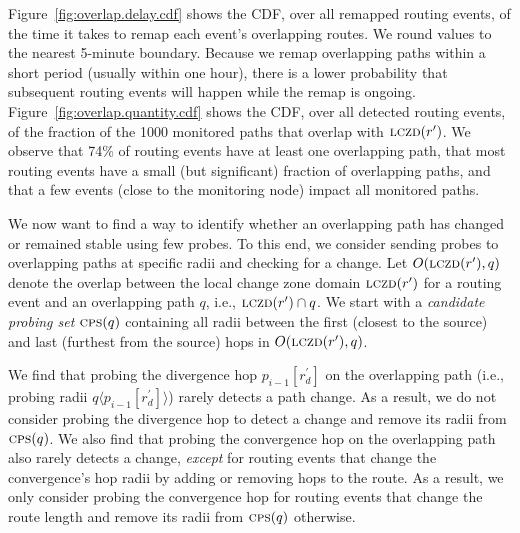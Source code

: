 
Figure~\ref{fig:overlap.delay.cdf} shows the CDF, over all remapped
routing events, of the time it takes to remap each event's
overlapping routes.  We round values to the nearest 5-minute
boundary.  Because we remap overlapping paths within a short period
(usually within one hour), there is a lower probability that
subsequent routing events will happen while the remap is ongoing.
Figure~\ref{fig:overlap.quantity.cdf} shows the CDF, over all
detected routing events, of the fraction of the 1000 monitored paths
that overlap with $\mathrm{\textsc{lczd}}(r')$.  We observe that 74\% of routing
events have at least one overlapping path, that most routing events
have a small (but significant) fraction of overlapping paths, and
that a few events (close to the monitoring node) impact all
monitored paths.

  We now want to find a way
to identify whether an overlapping path has changed or remained
stable using few probes.  To this end, we consider sending probes to
overlapping paths at specific radii and checking for a change.  Let
$O(\mathrm{\textsc{lczd}}(r'), q)$ denote the overlap between the local change zone
domain $\mathrm{\textsc{lczd}}(r')$ for a routing event and an overlapping path $q$,
i.e., $\mathrm{\textsc{lczd}}(r')\cap{}q$.  We start with a \emph{candidate probing
set} $\mathrm{\textsc{cps}}(q)$ containing all radii between the first (closest to
the source) and last (furthest from the source) hops in
$O(\mathrm{\textsc{lczd}}(r'), q)$.

We find that probing the divergence hop $p_{i-1}[r^\prime_d]$ on the
overlapping path (i.e., probing radii $q\langle p_{i-1}[r^\prime_d]
\rangle$) rarely detects a path change.  As a result, we do not
consider probing the divergence hop to detect a change and remove
its radii from $\mathrm{\textsc{cps}}(q)$.\footnotemark{}  We also find that probing
the convergence hop on the overlapping path also rarely detects
a change, \emph{except} for routing events that change the
convergence's hop radii by adding or removing hops to the route.  As
a result, we only consider probing the convergence hop for routing
events that change the route length and remove its radii from
$\mathrm{\textsc{cps}}(q)$ otherwise.


